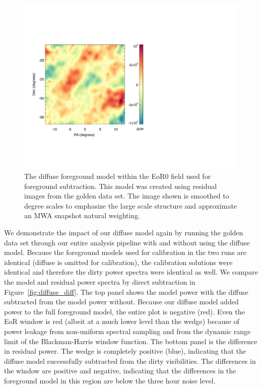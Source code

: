 \documentclass[iop]{emulateapj}
\begin{document}
\begin{figure}
\begin{center}
\includegraphics[width=\columnwidth]{diffuse_sky.pdf}
\caption[Diffuse model used for subtraction]{
The diffuse foreground model within the EoR0 field used for foreground subtraction. This 
model was created using residual images from the golden data set. The image shown is 
smoothed to degree scales to emphasize the large scale structure and approximate an 
MWA snapshot natural weighting.
\label{fig:diffuse}
}
\end{center}
\end{figure}

We demonstrate the impact of our diffuse model again by running the golden data set 
through our entire analysis pipeline with and without using the diffuse model. Because the 
foreground models used for calibration in the two runs are identical (diffuse is omitted for 
calibration), the calibration solutions were identical and therefore the dirty power spectra 
were identical as well. We compare the model and residual power spectra by direct 
subtraction in Figure~\ref{fig:diffuse_diff}. The top panel shows the model power with the 
diffuse subtracted from the model power without. 
Because our diffuse model added power to the full foreground model, the entire plot is
negative (red).
Even the EoR window is red (albeit at a much lower level than the wedge) because of power
leakage from non-uniform spectral sampling and from the dynamic range limit of the 
Blackman-Harris window function.
The bottom panel is the difference in residual 
power. The wedge is completely positive (blue), indicating that the diffuse model 
successfully subtracted from the dirty visibilities. The differences in the window are positive 
and negative, indicating that 
the differences in the foreground model in this region are below the three hour noise level.
\end{document}
